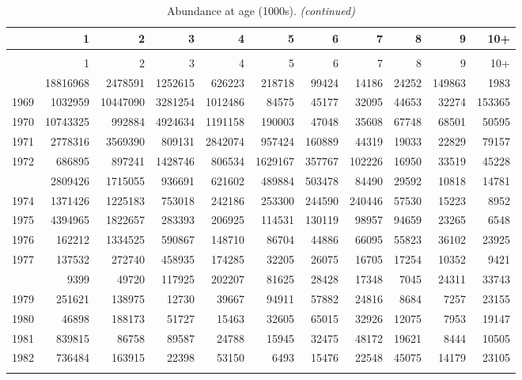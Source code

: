 \documentclass[
]{article}
\begin{document}
\begin{longtable}[t]{lrrrrrrrrrr}
\caption{\label{tab:NAA-table}Abundance at age (1000s).}\\
\toprule
  & 1 & 2 & 3 & 4 & 5 & 6 & 7 & 8 & 9 & 10+\\
\midrule
\endfirsthead
\caption[]{Abundance at age (1000s). \textit{(continued)}}\\
\toprule
  & 1 & 2 & 3 & 4 & 5 & 6 & 7 & 8 & 9 & 10+\\
\midrule
\endhead

\endfoot
\bottomrule
\endlastfoot
1968 & 18816968 & 2478591 & 1252615 & 626223 & 218718 & 99424 & 14186 & 24252 & 149863 & 1983\\
1969 & 1032959 & 10447090 & 3281254 & 1012486 & 84575 & 45177 & 32095 & 44653 & 32274 & 153365\\
1970 & 10743325 & 992884 & 4924634 & 1191158 & 190003 & 47048 & 35608 & 67748 & 68501 & 50595\\
1971 & 2778316 & 3569390 & 809131 & 2842074 & 957424 & 160889 & 44319 & 19033 & 22829 & 79157\\
1972 & 686895 & 897241 & 1428746 & 806534 & 1629167 & 357767 & 102226 & 16950 & 33519 & 45228\\
\addlinespace
1973 & 2809426 & 1715055 & 936691 & 621602 & 489884 & 503478 & 84490 & 29592 & 10818 & 14781\\
1974 & 1371426 & 1225183 & 753018 & 242186 & 253300 & 244590 & 240446 & 57530 & 15223 & 8952\\
1975 & 4394965 & 1822657 & 283393 & 206925 & 114531 & 130119 & 98957 & 94659 & 23265 & 6548\\
1976 & 162212 & 1334525 & 590867 & 148710 & 86704 & 44886 & 66095 & 55823 & 36102 & 23925\\
1977 & 137532 & 272740 & 458935 & 174285 & 32205 & 26075 & 16705 & 17254 & 10352 & 9421\\
\addlinespace
1978 & 9399 & 49720 & 117925 & 202207 & 81625 & 28428 & 17348 & 7045 & 24311 & 33743\\
1979 & 251621 & 138975 & 12730 & 39667 & 94911 & 57882 & 24816 & 8684 & 7257 & 23155\\
1980 & 46898 & 188173 & 51727 & 15463 & 32605 & 65015 & 32926 & 12075 & 7953 & 19147\\
1981 & 839815 & 86758 & 89587 & 24788 & 15945 & 32475 & 48172 & 19621 & 8444 & 10505\\
1982 & 736484 & 163915 & 22398 & 53150 & 6493 & 15476 & 22548 & 45075 & 14179 & 23105\\
\addlinespace

\end{longtable}
\end{document}

